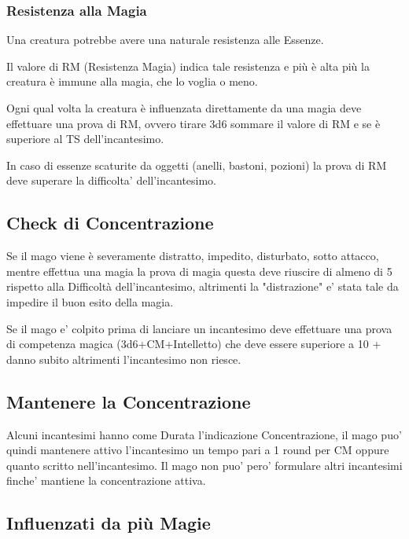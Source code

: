 \begin{multicols}{2}
\subsubsection{Resistenza alla Magia}

Una creatura potrebbe avere una naturale resistenza alle Essenze.

Il valore di RM (Resistenza Magia) indica tale resistenza e più è alta più la creatura è immune alla magia, che lo voglia o meno.

Ogni qual volta la creatura è influenzata direttamente da una magia deve effettuare una prova di RM, ovvero tirare 3d6 sommare il valore di RM e se è superiore al TS dell'incantesimo.

In caso di essenze scaturite da oggetti (anelli, bastoni, pozioni) la prova di RM deve superare la difficolta' dell'incantesimo.

\subsection{Check di Concentrazione}

Se il mago viene è severamente distratto, impedito, disturbato, sotto attacco, mentre effettua una magia la prova di magia questa deve riuscire di almeno di 5 rispetto alla Difficoltà dell'incantesimo, altrimenti la "distrazione" e' stata tale da impedire il buon esito della magia.

Se il mago e' colpito prima di lanciare un incantesimo deve effettuare una prova di competenza magica (3d6+CM+Intelletto) che deve essere superiore a 10 + danno subito altrimenti l'incantesimo non riesce.

\subsection{Mantenere la Concentrazione}

Alcuni incantesimi hanno come Durata l'indicazione Concentrazione, il mago puo' quindi mantenere attivo l'incantesimo un tempo pari a 1 round per CM oppure quanto scritto nell'incantesimo.
Il mago non puo' pero' formulare altri incantesimi finche' mantiene la concentrazione attiva.

\subsection{Influenzati da più Magie}


\end{multicols}
